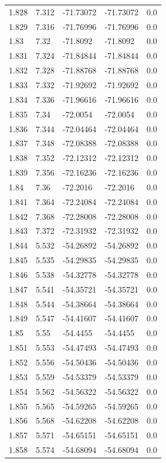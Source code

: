 \begin{tabular}{lllll}
1.828 & 7.312 & -71.73072 & -71.73072 & 0.0 \\
1.829 & 7.316 & -71.76996 & -71.76996 & 0.0 \\
1.83 & 7.32 & -71.8092 & -71.8092 & 0.0 \\
1.831 & 7.324 & -71.84844 & -71.84844 & 0.0 \\
1.832 & 7.328 & -71.88768 & -71.88768 & 0.0 \\
1.833 & 7.332 & -71.92692 & -71.92692 & 0.0 \\
1.834 & 7.336 & -71.96616 & -71.96616 & 0.0 \\
1.835 & 7.34 & -72.0054 & -72.0054 & 0.0 \\
1.836 & 7.344 & -72.04464 & -72.04464 & 0.0 \\
1.837 & 7.348 & -72.08388 & -72.08388 & 0.0 \\
1.838 & 7.352 & -72.12312 & -72.12312 & 0.0 \\
1.839 & 7.356 & -72.16236 & -72.16236 & 0.0 \\
1.84 & 7.36 & -72.2016 & -72.2016 & 0.0 \\
1.841 & 7.364 & -72.24084 & -72.24084 & 0.0 \\
1.842 & 7.368 & -72.28008 & -72.28008 & 0.0 \\
1.843 & 7.372 & -72.31932 & -72.31932 & 0.0 \\
1.844 & 5.532 & -54.26892 & -54.26892 & 0.0 \\
1.845 & 5.535 & -54.29835 & -54.29835 & 0.0 \\
1.846 & 5.538 & -54.32778 & -54.32778 & 0.0 \\
1.847 & 5.541 & -54.35721 & -54.35721 & 0.0 \\
1.848 & 5.544 & -54.38664 & -54.38664 & 0.0 \\
1.849 & 5.547 & -54.41607 & -54.41607 & 0.0 \\
1.85 & 5.55 & -54.4455 & -54.4455 & 0.0 \\
1.851 & 5.553 & -54.47493 & -54.47493 & 0.0 \\
1.852 & 5.556 & -54.50436 & -54.50436 & 0.0 \\
1.853 & 5.559 & -54.53379 & -54.53379 & 0.0 \\
1.854 & 5.562 & -54.56322 & -54.56322 & 0.0 \\
1.855 & 5.565 & -54.59265 & -54.59265 & 0.0 \\
1.856 & 5.568 & -54.62208 & -54.62208 & 0.0 \\
1.857 & 5.571 & -54.65151 & -54.65151 & 0.0 \\
1.858 & 5.574 & -54.68094 & -54.68094 & 0.0 \\

\end{tabular}

